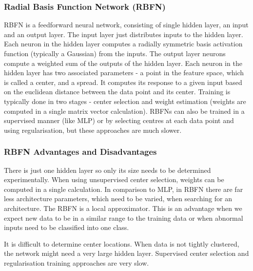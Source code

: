\documentclass[a4paper, 11pt]{article}
\begin{document}
\subsubsection{Radial Basis Function Network (RBFN)}
RBFN is a feedforward neural network, consisting of single hidden layer, an input and an output layer. The input layer just distributes inputs to the hidden layer. Each neuron in the hidden layer computes a radially symmetric basis activation function (typically a Gaussian) from the inputs. The output layer neurons compute a weighted sum of the outputs of the hidden layer. Each neuron in the hidden layer has two associated parameters - a point in the feature space, which is called a center, and a spread. It computes its response to a given input based on the euclidean distance between the data point and its center. Training is typically done in two stages - center selection and weight estimation (weights are computed in a single matrix vector calculation). RBFNs can also be trained in a supervised manner (like MLP) or by selecting centres at each data point and using regularisation, but these approaches are much slower.
\subsubsection{RBFN Advantages and Disadvantages}
There is just one hidden layer so only its size needs to be determined experimentally. When using unsupervised center selection, weights can be computed in a single calculation. In comparison to MLP, in RBFN there are far less architecture parameters, which need to be varied, when searching for an architecture. The RBFN is a local approximator. This is an advantage when we expect new data to be in a similar range to the training data or when abnormal inputs need to be classified into one class. 

It is difficult to determine center locations. When data is not tightly clustered, the network might need a very large hidden layer.  Supervised center selection and regularisation training approaches are very slow. 
\end{document}
